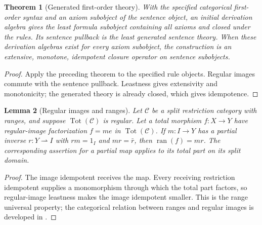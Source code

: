\documentclass[11pt]{article}
\newtheorem{theorem}{Theorem}[section]
\newtheorem{lemma}[theorem]{Lemma}
\theoremstyle{definition}\newtheorem{definition}[theorem]{Definition}
\newcommand{\Tot}{\operatorname{Tot}}
\newcommand{\ran}{\operatorname{ran}}
\begin{document}
\begin{theorem}[Generated first-order theory]
With the specified categorical first-order syntax and an axiom
subobject of the sentence object, an initial derivation algebra
gives the least formula subobject containing all axioms and closed
under the rules. Its sentence pullback is the least generated
sentence theory. When these derivation algebras exist for every
axiom subobject, the construction is an extensive, monotone,
idempotent closure operator on sentence subobjects.
\end{theorem}
\begin{proof}
Apply the preceding theorem to the specified rule objects.
Regular images commute with the sentence pullback. Leastness gives
extensivity and monotonicity; the generated theory is already
closed, which gives idempotence.
\end{proof}

\begin{lemma}[Regular images and ranges]
Let $\mathcal C$ be a split restriction category with ranges,
and suppose $\Tot(\mathcal C)$ is regular. Let a total morphism
$f:X\to Y$ have regular-image factorization $f=me$ in
$\Tot(\mathcal C)$. If $m:I\to Y$ has a partial inverse
$r:Y\rightharpoonup I$ with $rm=1_I$ and $mr=\bar r$, then
$\ran(f)=mr$. The corresponding assertion for a partial map
applies to its total part on its split domain.
\end{lemma}
\begin{proof}
The image idempotent receives the map. Every receiving restriction
idempotent supplies a monomorphism through which the total part
factors, so regular-image leastness makes the image idempotent
smaller. This is the range universal property; the categorical
relation between ranges and regular images is developed in
\cite{RangeII}.
\end{proof}
\end{document}
